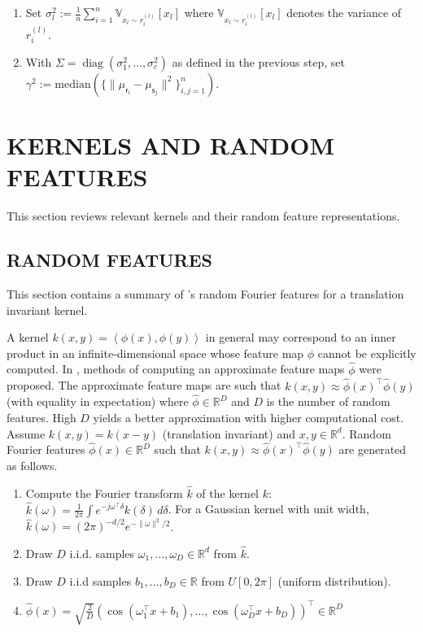 \documentclass[english]{article}
\theoremstyle{plain}
\theoremstyle{plain}
\newcommand{\diag}{\mathop{\mathrm{diag}}}
\begin{document}
\begin{enumerate}
    \item Set $\sigma_l^2 := \frac{1}{n} \sum_{i=1}^n \mathbb{V}_{x_l \sim
            r_i^{(l)}}[x_l]$ where $ \mathbb{V}_{x_l \sim
                r_i^{(l)}}[x_l]$ denotes the variance of $r_i^{(l)}$.
            \item With $\Sigma = \diag(\sigma^2_1, \ldots, \sigma^2_c)$ as defined 
                in the previous step, set $\gamma^2 := \mathrm{median}\left( \{ \| \mu_{\mathsf{r}_i}
                - \mu_{\mathsf{s}_j}\|^2\}_{i,j=1}^n \right)$.
\end{enumerate}


\section{KERNELS AND RANDOM FEATURES}
\label{sec:kernel_random_features}

This section reviews relevant kernels and their random feature representations.

\subsection{RANDOM FEATURES}

This section contains a summary of 's random
Fourier features for a translation invariant kernel. 

A kernel $k(x,y)=\left\langle \phi(x),\phi(y)\right\rangle $ in general
may correspond to an inner product in an infinite-dimensional space
whose feature map $\phi$ cannot be explicitly computed. In ,
methods of computing an approximate feature maps $\hat{\phi}$ were
proposed. The approximate feature maps are such that $k(x,y)\approx\hat{\phi}(x)^{\top}\hat{\phi}(y)$
(with equality in expectation) where $\hat{\phi}\in\mathbb{R}^{D}$
and $D$ is the number of random features. High $D$ yields a better
approximation with higher computational cost. Assume $k(x,y)=k(x-y)$ (translation invariant)
and $x,y\in\mathbb{R}^{d}$. Random Fourier features $\hat{\phi}(x)\in\mathbb{R}^{D}$
such that $k(x,y)\approx\hat{\phi}(x)^{\top}\hat{\phi}(y)$ are generated
as follows.
\begin{enumerate}
\item Compute the Fourier transform $\hat{k}$ of the kernel $k$: $\hat{k}(\omega)=\frac{1}{2\pi}\int e^{-j\omega^{\top}\delta}k(\delta)\, d\delta$.
For a Gaussian kernel with unit width, $\hat{k}(\omega)=\left(2\pi\right)^{-d/2}e^{-\|\omega\|^{2}/2}$.
\item Draw $D$ i.i.d. samples $\omega_{1},\ldots,\omega_{D}\in\mathbb{R}^{d}$
from $\hat{k}$. 
\item Draw $D$ i.i.d samples $b_{1},\ldots,b_{D}\in\mathbb{R}$ from $U[0,2\pi]$
(uniform distribution).
\item $\hat{\phi}(x)=\sqrt{\frac{2}{D}}\left(\cos\left(\omega_{1}^{\top}x+b_{1}\right),\ldots,\cos\left(\omega_{D}^{\top}x+b_{D}\right)\right)^{\top}\in\mathbb{R}^{D}$
\end{enumerate}
\end{document}
